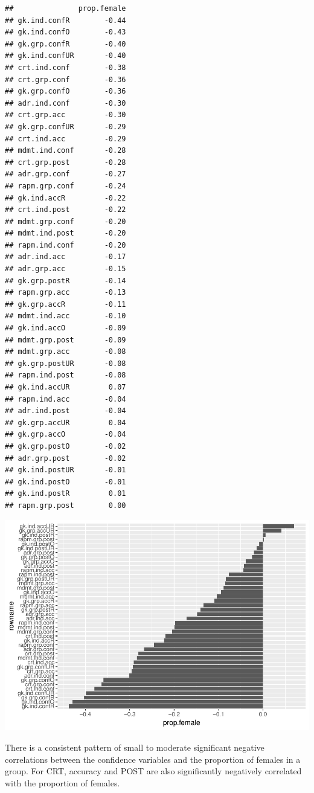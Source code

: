 \documentclass[]{article}
\begin{document}
\begin{verbatim}
##               prop.female
## gk.ind.confR        -0.44
## gk.ind.confO        -0.43
## gk.grp.confR        -0.40
## gk.ind.confUR       -0.40
## crt.ind.conf        -0.38
## crt.grp.conf        -0.36
## gk.grp.confO        -0.36
## adr.ind.conf        -0.30
## crt.grp.acc         -0.30
## gk.grp.confUR       -0.29
## crt.ind.acc         -0.29
## mdmt.ind.conf       -0.28
## crt.grp.post        -0.28
## adr.grp.conf        -0.27
## rapm.grp.conf       -0.24
## gk.ind.accR         -0.22
## crt.ind.post        -0.22
## mdmt.grp.conf       -0.20
## mdmt.ind.post       -0.20
## rapm.ind.conf       -0.20
## adr.ind.acc         -0.17
## adr.grp.acc         -0.15
## gk.grp.postR        -0.14
## rapm.grp.acc        -0.13
## gk.grp.accR         -0.11
## mdmt.ind.acc        -0.10
## gk.ind.accO         -0.09
## mdmt.grp.post       -0.09
## mdmt.grp.acc        -0.08
## gk.grp.postUR       -0.08
## rapm.ind.post       -0.08
## gk.ind.accUR         0.07
## rapm.ind.acc        -0.04
## adr.ind.post        -0.04
## gk.grp.accUR         0.04
## gk.grp.accO         -0.04
## gk.grp.postO        -0.02
## adr.grp.post        -0.02
## gk.ind.postUR       -0.01
## gk.ind.postO        -0.01
## gk.ind.postR         0.01
## rapm.grp.post        0.00
\end{verbatim}

\includegraphics{corr_analyses_files/figure-latex/female1-1.pdf}

There is a consistent pattern of small to moderate significant negative
correlations between the confidence variables and the proportion of
females in a group. For CRT, accuracy and POST are also significantly
negatively correlated with the proportion of females.
\end{document}

